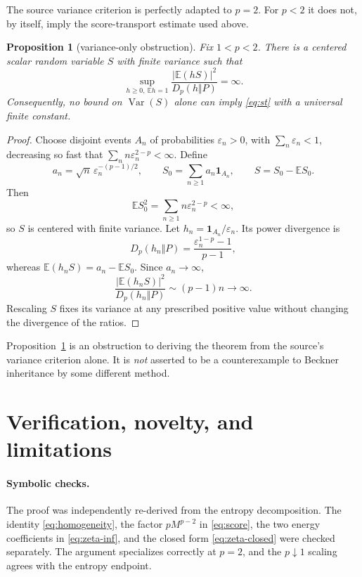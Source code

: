 \documentclass[11pt]{article}
\newtheorem{proposition}[theorem]{Proposition}
\theoremstyle{remark}
\newcommand{\E}{\mathbb E}
\newcommand{\Var}{\operatorname{Var}}
\begin{document}
The source variance criterion is perfectly adapted to $p=2$.  For $p<2$ it
does not, by itself, imply the score-transport estimate used above.

\begin{proposition}[variance-only obstruction]
\label{prop:variance}
Fix $1<p<2$.  There is a centered scalar random variable $S$ with finite
variance such that
\[
 \sup_{h\geq0,\ \E h=1}
 \frac{|\E(hS)|^2}{D_p(h\Vert P)}=\infty.
\]
Consequently, no bound on $\Var(S)$ alone can imply \eqref{eq:st} with a
universal finite constant.
\end{proposition}

\begin{proof}
Choose disjoint events $A_n$ of probabilities $\varepsilon_n>0$, with
$\sum_n\varepsilon_n<1$, decreasing so fast that
$\sum_n n\varepsilon_n^{2-p}<\infty$.  Define
\[
 a_n=\sqrt n\,\varepsilon_n^{-(p-1)/2},\qquad
 S_0=\sum_{n\geq1}a_n\mathbf1_{A_n},\qquad
 S=S_0-\E S_0.
\]
Then
\[
 \E S_0^2=\sum_{n\geq1}n\varepsilon_n^{2-p}<\infty,
\]
so $S$ is centered with finite variance.  Let
$h_n=\mathbf1_{A_n}/\varepsilon_n$.  Its power divergence is
\[
 D_p(h_n\Vert P)
 =\frac{\varepsilon_n^{1-p}-1}{p-1},
\]
whereas $\E(h_nS)=a_n-\E S_0$.  Since $a_n\to\infty$,
\[
 \frac{|\E(h_nS)|^2}{D_p(h_n\Vert P)}
 \sim (p-1)n\longrightarrow\infty.
\]
Rescaling $S$ fixes its variance at any prescribed positive value without
changing the divergence of the ratios.
\end{proof}

Proposition~\ref{prop:variance} is an obstruction to deriving the theorem
from the source's variance criterion alone.  It is \emph{not} asserted to be
a counterexample to Beckner inheritance by some different method.

\section{Verification, novelty, and limitations}

\paragraph{Symbolic checks.}
The proof was independently re-derived from the entropy decomposition.  The
identity \eqref{eq:homogeneity}, the factor $pM^{p-2}$ in \eqref{eq:score},
the two energy coefficients in \eqref{eq:zeta-inf}, and the closed form
\eqref{eq:zeta-closed} were checked separately.  The argument specializes
correctly at $p=2$, and the $p\downarrow1$ scaling agrees with the entropy
endpoint.
\end{document}
